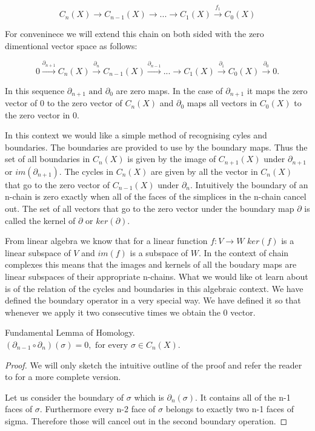 $$ C_n(X) \longrightarrow C_{n-1}(X) \longrightarrow ... \longrightarrow C_1(X) \overset{f_1}{\longrightarrow} C_0(X) $$

For conveninece we will extend this chain on both sided with the zero dimentional vector space as follows:

$$ 0 \overset{\partial_{n+1}}{\longrightarrow} C_n(X) \overset{\partial_{n}}{\longrightarrow} C_{n-1}(X) \overset{\partial_{n-1}}{\longrightarrow} ... \longrightarrow C_1(X) \overset{\partial_1}{\longrightarrow} C_0(X) \overset{\partial_0}{\longrightarrow} 0. $$

In this sequence $\partial_{n+1} \text{ and } \partial_{0}$ are zero maps. In the case of $\partial_{n+1}$ it maps the zero vector of $0$ to the zero vector of $C_n(X)$ and $\partial_0$ maps all vectors in $C_0(X)$ to the zero vector in $0$.

In this context we would like a simple method of recognising cyles and boundaries. The boundaries are provided to use by the boundary maps. Thus the set of all boundaries in $C_n(X)$ is given by the image of $C_{n+1}(X)$ under $\partial_{n+1}$ or $im(\partial_{n+1})$. The cycles in $C_n(X)$ are given by all the vector in $C_n(X)$ that go to the zero vector of $C_{n-1}(X)$ under $\partial_n$. Intuitively the boundary of an n-chain is zero exactly when all of the faces of the simplices in the n-chain cancel out. The set of all vectors that go to the zero vector under the boundary map $\partial$ is called the kernel of $\partial$ or $ker(\partial)$.

From linear algebra we know that for a linear function $f: V \to W$ $ker(f)$ is a linear subspace of $V$ and $im(f)$ is a subspace of $W$. In the context of chain complexes this means that the images and kernels of all the boudary maps are linear subspaces of their appropriate n-chains. What we would like ot learn about is of the relation of the cycles and boundaries in this algebraic context. We have defined the boundary operator in a very special way. We have defined it so that whenever we apply it two consecutive times we obtain the 0 vector.


\begin{lem} Fundamental Lemma of Homology. $(\partial_{n-1} \circ \partial_n) (\sigma) = 0, \text{ for every } \sigma \in C_{n}(X)$. \end{lem}

\begin{proof}
    We will only sketch the intuitive outline of the proof and refer the reader to \cite{algebraic-topology} for a more complete version.

    Let us consider the boundary of $\sigma$ which is $\partial_n(\sigma)$. It contains all of the n-1 faces of $\sigma$. Furthermore every n-2 face of $\sigma$ belongs to exactly two n-1 faces of sigma. Therefore those will cancel out in the second boundary operation.
\end{proof}


